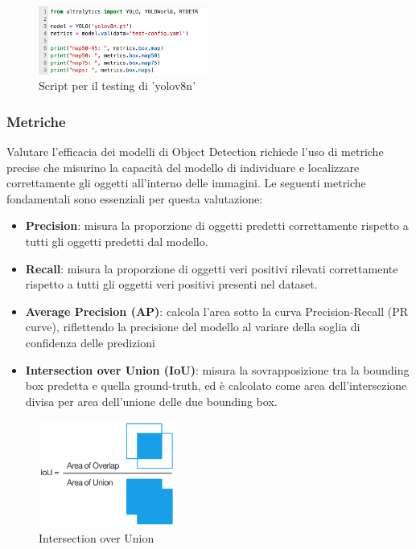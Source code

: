 \begin{figure}[ht]
    \centering
    \includegraphics[width=0.5\textwidth]{files/capitoli/4-sperimentazione-risultati/assets/test-script.png}
    \caption{\label{fig:test-script}Script per il testing di 'yolov8n'}
\end{figure}

\subsubsection{Metriche}
Valutare l'efficacia dei modelli di Object Detection richiede l'uso di metriche precise che misurino la capacità del modello di individuare e localizzare correttamente gli oggetti all'interno delle immagini. Le seguenti metriche fondamentali sono essenziali per questa valutazione:

\begin{itemize}
    \item \textbf{Precision}: misura la proporzione di oggetti predetti correttamente rispetto a tutti gli oggetti predetti dal modello.
    \item \textbf{Recall}: misura la proporzione di oggetti veri positivi rilevati correttamente rispetto a tutti gli oggetti veri positivi presenti nel dataset.
    \item \textbf{Average Precision (AP)}: calcola l'area sotto la curva Precision-Recall (PR curve), riflettendo la precisione del modello al variare della soglia di confidenza delle predizioni
    \item \textbf{Intersection over Union (IoU)}: misura la sovrapposizione tra la bounding box predetta e quella ground-truth, ed è calcolato come area dell'intersezione divisa per area dell'unione delle due bounding box.
\end{itemize}

\begin{figure}[ht]
    \centering
    \includegraphics[width=0.4\textwidth]{files/capitoli/4-sperimentazione-risultati/assets/iou.png}
    \caption{\label{fig:iou}Intersection over Union\cite{42}}
\end{figure}

